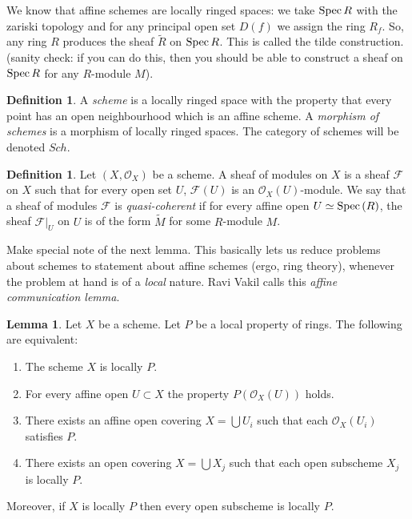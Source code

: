 \documentclass[11pt]{amsart}
\newcommand{\Spec}{{\rm Spec \,}}
\renewcommand{\tilde}{\widetilde}
\theoremstyle{definition}
\newtheorem{lemma}[theorem]{Lemma}
\newtheorem{definition}[theorem]{Definition}
\begin{document}
We know that affine schemes are locally ringed spaces: we take $\Spec R$ with the zariski topology and for any principal open set $D(f)$ we assign the ring $R_f$. So, any ring $R$ produces the sheaf $\tilde{R}$ on $\Spec R$. This is called the tilde construction. (sanity check: if you can do this, then you should be able to construct a sheaf on $\Spec R$ for any $R$-module $M$).


\begin{definition}
	\label{definition-scheme}
	A {\it scheme} is a locally ringed space with the property that
	every point has an open neighbourhood which is an affine scheme.
	A {\it morphism of schemes} is a morphism of locally
	ringed spaces. The category of schemes will be denoted
	$Sch$.
\end{definition}

\begin{definition}
	\label{definition-quasi-coherent-sheaf}
	Let $(X,\mathcal{O}_X)$ be a scheme. A sheaf of modules on $X$ is a sheaf $\mathcal{F}$ on $X$ such that for every open set $U$, $\mathcal{F}(U)$ is an $\mathcal{O}_X(U)$-module. We say that a sheaf of modules $\mathcal{F}$ is \textit{quasi-coherent} if for every affine open $U\simeq \Spec(R)$, the sheaf $\mathcal{F}|_U$ on $U$ is of the form $\tilde{M}$ for some $R$-module $M$.
\end{definition}


Make special note of the next lemma. This basically lets us reduce problems about schemes to statement about affine schemes (ergo, ring theory), whenever the problem at hand is of a \textit{local} nature. Ravi Vakil calls this \textit{affine communication lemma}.

\begin{lemma}
	\label{lemma-locally-P}
	Let $X$ be a scheme. Let $P$ be a local property of rings.
	The following are equivalent:
	\begin{enumerate}
		\item The scheme $X$ is locally $P$.
		\item For every affine open $U \subset X$ the property
		$P(\mathcal{O}_X(U))$ holds.
		\item There exists an affine open covering $X = \bigcup U_i$ such that
		each $\mathcal{O}_X(U_i)$ satisfies $P$.
		\item There exists an open covering $X = \bigcup X_j$
		such that each open subscheme $X_j$ is locally $P$.
	\end{enumerate}
	Moreover, if $X$ is locally $P$ then every open subscheme
	is locally $P$.
\end{lemma}
\end{document}
